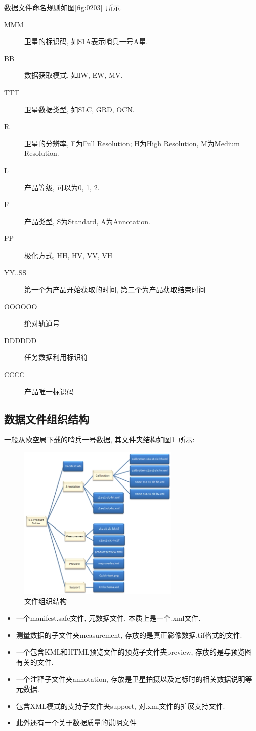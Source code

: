 数据文件命名规则如图\ref{fig:0203}~所示.

\begin{description}
    \item[MMM] 卫星的标识码, 如S1A表示哨兵一号A星.
    \item[BB] 数据获取模式, 如IW, EW, MV.
    \item[TTT] 卫星数据类型, 如SLC, GRD, OCN. 
    \item[R] 卫星的分辨率, F为Full Resolution; H为High Resolution, M为Medium Resolution.
    \item[L] 产品等级, 可以为0, 1, 2.
    \item[F] 产品类型, S为Standard, A为Annotation.
    \item[PP] 极化方式, HH, HV, VV, VH
    \item[YY..SS] 第一个为产品开始获取的时间, 第二个为产品获取结束时间
    \item[OOOOOO] 绝对轨道号
    \item[DDDDDD] 任务数据利用标识符
    \item[CCCC] 产品唯一标识码          
\end{description}

\subsection{数据文件组织结构}

一般从欧空局下载的哨兵一号数据, 其文件夹结构如图\ref{fig:0204}~所示:
\begin{figure}[!htbp]
    \centering
    \includegraphics[height=20em]{pic/chap02xx04.jpg}
    \caption{文件组织结构}
    \label{fig:0204}
\end{figure}

\begin{itemize}
    \item 一个manifest.safe文件, 元数据文件, 本质上是一个.xml文件.
    \item 测量数据的子文件夹measurement, 存放的是真正影像数据.tif格式的文件.
    \item 一个包含KML和HTML预览文件的预览子文件夹preview, 存放的是与预览图有关的文件.
    \item 一个注释子文件夹annotation, 存放是卫星拍摄以及定标时的相关数据说明等元数据.
    \item 包含XML模式的支持子文件夹support, 对.xml文件的扩展支持文件.
    \item 此外还有一个关于数据质量的说明文件
\end{itemize}



